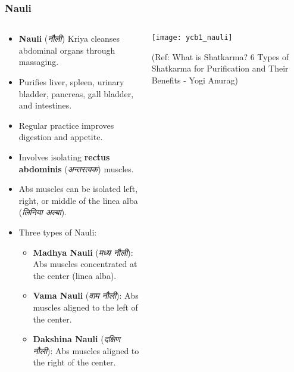 \begin{frame}[fragile]\frametitle{Nauli}
\begin{columns}
    \begin{column}[T]{0.6\linewidth}
      \begin{itemize}
          \item \textbf{Nauli} (\textit{नौली}) Kriya cleanses abdominal organs through massaging.
          \item Purifies liver, spleen, urinary bladder, pancreas, gall bladder, and intestines.
          \item Regular practice improves digestion and appetite.
          \item Involves isolating \textbf{rectus abdominis} (\textit{अन्तरत्वक}) muscles.
          \item Abs muscles can be isolated left, right, or middle of the linea alba (\textit{लिनिया अल्बा}).
          \item Three types of Nauli:
            \begin{itemize}
              \item \textbf{Madhya Nauli} (\textit{मध्य नौली}): Abs muscles concentrated at the center (linea alba).
              \item \textbf{Vama Nauli} (\textit{वाम नौली}): Abs muscles aligned to the left of the center.
              \item \textbf{Dakshina Nauli} (\textit{दक्षिण नौली}): Abs muscles aligned to the right of the center.
            \end{itemize}
      \end{itemize}
    \end{column}
    \begin{column}[T]{0.4\linewidth}
        \begin{center}
        \texttt{[image: ycb1\_nauli]}
		
		{\tiny (Ref: What is Shatkarma? 6 Types of Shatkarma for Purification and Their Benefits - Yogi Anurag)}	
        \end{center}	
    \end{column}
\end{columns}	  
\end{frame}


